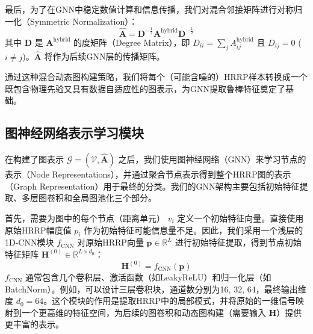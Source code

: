 最后，为了在GNN中稳定数值计算和信息传播，我们对混合邻接矩阵进行对称归一化（Symmetric Normalization）：
\begin{equation}
    \hat{\mathbf{A}} = \mathbf{D}^{-\frac{1}{2}} \mathbf{A}^{\text{hybrid}} \mathbf{D}^{-\frac{1}{2}}
    \label{eq:normalized_adjacency}
\end{equation}
其中 $\mathbf{D}$ 是 $\mathbf{A}^{\text{hybrid}}$ 的度矩阵（Degree Matrix），即 $D_{ii} = \sum_j A^{\text{hybrid}}_{ij}$ 且 $D_{ij}=0$ ($i \neq j$)。$\hat{\mathbf{A}}$ 将作为后续GNN层的传播矩阵。

通过这种混合动态图构建策略，我们将每个（可能含噪的）HRRP样本转换成一个既包含物理先验又具有数据自适应性的图表示，为GNN提取鲁棒特征奠定了基础。

\subsection{图神经网络表示学习模块}
\label{subsec:gnn_module}

在构建了图表示 $\mathcal{G} = (\mathcal{V}, \hat{\mathbf{A}})$ 之后，我们使用图神经网络（GNN）来学习节点的表示（Node Representations），并通过聚合节点表示得到整个HRRP图的表示（Graph Representation）用于最终的分类。我们的GNN架构主要包括初始特征提取、多层图卷积和全局图池化三个部分。

首先，需要为图中的每个节点（距离单元） $v_i$ 定义一个初始特征向量。直接使用原始HRRP幅度值 $p_i$ 作为初始特征可能信息量不足。因此，我们采用一个浅层的1D-CNN模块 $f_{\text{CNN}}$ 对原始HRRP向量 $\mathbf{p} \in \mathbb{R}^{L}$ 进行初始特征提取，得到节点初始特征矩阵 $\mathbf{H}^{(0)} \in \mathbb{R}^{L \times d_0}$：
\begin{equation}
    \mathbf{H}^{(0)} = f_{\text{CNN}}(\mathbf{p})
    \label{eq:initial_features}
\end{equation}
$f_{\text{CNN}}$ 通常包含几个卷积层、激活函数（如LeakyReLU）和归一化层（如BatchNorm）。例如，可以设计三层卷积块，通道数分别为16, 32, 64，最终输出维度 $d_0=64$。这个模块的作用是提取HRRP中的局部模式，并将原始的一维信号映射到一个更高维的特征空间，为后续的图卷积和动态图构建（需要输入 $\mathbf{H}$）提供更丰富的表示。

